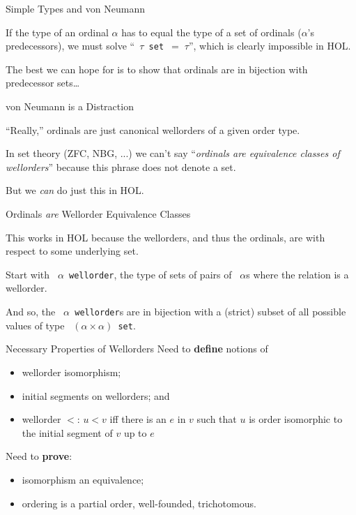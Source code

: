 \documentclass[xetex,14pt]{beamer}
\newcommand{\ty}[1]{\texttt{\color{MyPurple} #1}}
\begin{document}
\begin{frame}{Simple Types and von Neumann}

If the type of an ordinal $\alpha$ has to equal the type of a set of ordinals ($\alpha$’s predecessors), we must solve “\ty{$\tau$ set $=\; \tau$}”, which is clearly impossible in HOL.

\bigskip
The best we can hope for is to show that ordinals are in bijection with predecessor sets\dots

\end{frame}
\begin{frame}{von Neumann is a Distraction}

“Really,” ordinals are just canonical wellorders of a given order type.

\bigskip
In set theory (ZFC, NBG, ...) we can’t say “\emph{ordinals are equivalence classes of wellorders}” because this phrase does not denote a set.

\bigskip
But we \emph{can} do just this in HOL.

\end{frame}

\begin{frame}{Ordinals \emph{are} Wellorder Equivalence Classes}

This works in HOL because the wellorders, and thus the ordinals, are with respect to some underlying set.

\bigskip
Start with \ty{$\alpha$ wellorder}, the type of sets of pairs of \ty{$\alpha$}s where the relation is a wellorder.

\bigskip
And so, the \ty{$\alpha$ wellorder}s are in bijection with a (strict) subset of all possible values of type \ty{$(\alpha \times \alpha)$~set}.
\end{frame}

\begin{frame}{Necessary Properties of Wellorders}
Need to \textbf{define} notions of
\begin{itemize}
\item wellorder isomorphism;
\item initial segments on wellorders; and
\item wellorder $<$:  $u < v$ iff there is an $e$ in $v$ such that $u$ is order isomorphic to the initial segment of $v$ up to $e$
\end{itemize}

\bigskip
Need to \textbf{prove}:
\begin{itemize}
\item isomorphism an equivalence;
\item ordering is a partial order, well-founded, trichotomous.
\end{itemize}
\end{frame}
\end{document}
